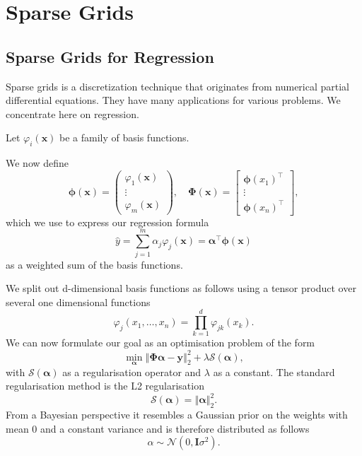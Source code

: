 \chapter{Sparse Grids}
\section{Sparse Grids for Regression}
Sparse grids is a discretization technique that originates from numerical partial differential equations.
They have many applications for various problems. We concentrate here on regression.

Let \( \varphi_i(\bm{x})\) be a family of basis functions.

We now define
\begin{equation}
\boldsymbol{\phi}(\boldsymbol{x}) = \begin{pmatrix}
  \varphi_1(\bm{x}) \\
  \vdots \\
  \varphi_m(\bm{x})
\end{pmatrix}
, \quad
\boldsymbol{\Phi}(\boldsymbol{x}) = \begin{bmatrix}
  \boldsymbol{\phi}(x_1)^\intercal\\
  \vdots \\
  \boldsymbol{\phi}(x_n)^\intercal
\end{bmatrix},
\end{equation}
which we use to express our regression formula
\begin{equation}
\hat{y} = \sum_{j = 1}^m \alpha_j \varphi_{j}(\bm{x}) = \boldsymbol{\alpha}^\intercal \bm{\phi} (\bm{x})
\end{equation}
as a weighted sum of the basis functions.

We split out d-dimensional basis functions as follows using a tensor product
over several one dimensional functions
\begin{equation}
\varphi_j (x_1, \ldots, x_n) = \prod_{k=1}^d \varphi_{jk} (x_k).
\end{equation}
We can now formulate our goal as an optimisation problem of the form
\begin{equation}
  \label{eq:optGoal}
\min_{\bm{\alpha}} \left\Vert  \bm{\Phi} \bm{\alpha} - \bm{y}   \right\Vert_2^2  + \lambda \mathcal{S}(\bm{\alpha}), 
\end{equation}
with \(\mathcal{S}(\bm{\alpha})\) as a regularisation operator and \(\lambda\) as a constant.
The standard regularisation method is the L2 regularisation 
\begin{equation}
\mathcal{S}(\bm{\alpha}) = \left\Vert \bm{\alpha} \right\Vert_2^2.
\end{equation}
From a Bayesian perspective it resembles a Gaussian prior on the weights with mean 0 and
a constant variance  and is therefore distributed as follows
\begin{equation}
\alpha \sim \mathcal{N} (0, \bm{I} \sigma^2 ).
\end{equation}

